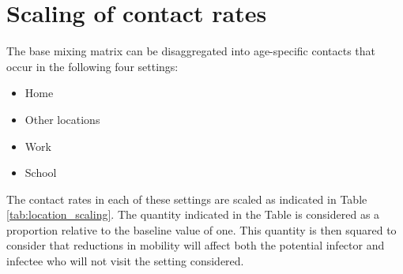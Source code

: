 \section{Scaling of contact rates}
The base mixing matrix can be disaggregated into age-specific contacts that occur 
in the following four settings:
\begin{itemize}
    \item Home
    \item Other locations
    \item Work
    \item School
\end{itemize}
The contact rates in each of these settings are scaled as indicated in 
Table \ref{tab:location_scaling}.
The quantity indicated in the Table is considered as a proportion relative to
the baseline value of one.
This quantity is then squared to consider that reductions in mobility will affect
both the potential infector and infectee who will not visit the setting considered.
